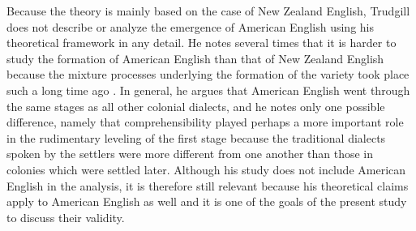 Because the theory is mainly based on the case of New Zealand English, Trudgill does not describe or analyze the emergence of American English using his theoretical framework in any detail. He notes several times that it is harder to study the formation of American English than that of New Zealand English because the mixture processes underlying the formation of the variety took place such a long time ago \citep[2]{Trudgill2004}. In general, he argues that American English went through the same stages as all other colonial dialects, and he notes only one possible difference, namely that comprehensibility played perhaps a more important role in the rudimentary leveling of the first stage because the traditional dialects spoken by the settlers were more different from one another than those in colonies which were settled later. Although his study does not include American English in the analysis, it is therefore still relevant because his theoretical claims apply to American English as well and it is one of the goals of the present study to discuss their validity.


